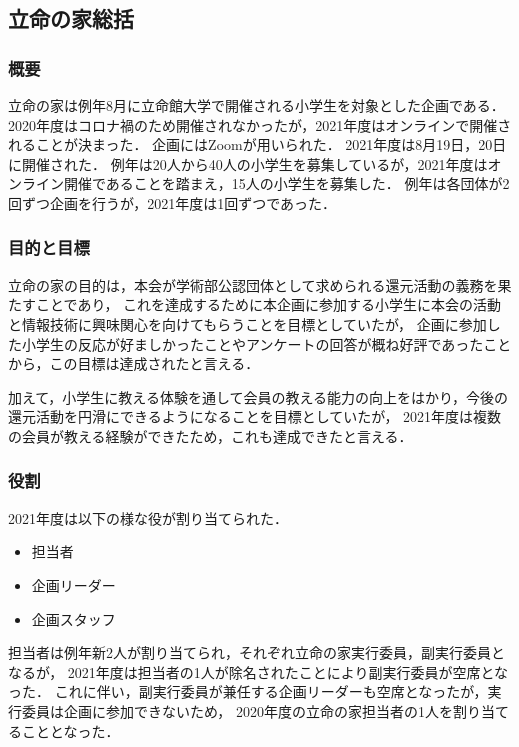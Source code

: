 \subsection*{立命の家総括}


\subsubsection*{概要}
立命の家は例年8月に立命館大学で開催される小学生を対象とした企画である．
2020年度はコロナ禍のため開催されなかったが，2021年度はオンラインで開催されることが決まった．
企画にはZoomが用いられた．
2021年度は8月19日，20日に開催された．
例年は20人から40人の小学生を募集しているが，2021年度はオンライン開催であることを踏まえ，15人の小学生を募集した．
例年は各団体が2回ずつ企画を行うが，2021年度は1回ずつであった．

\subsubsection*{目的と目標}
立命の家の目的は，本会が学術部公認団体として求められる還元活動の義務を果たすことであり，
これを達成するために本企画に参加する小学生に本会の活動と情報技術に興味関心を向けてもらうことを目標としていたが，
企画に参加した小学生の反応が好ましかったことやアンケートの回答が概ね好評であったことから，この目標は達成されたと言える．

加えて，小学生に教える体験を通して会員の教える能力の向上をはかり，今後の還元活動を円滑にできるようになることを目標としていたが，
2021年度は複数の会員が教える経験ができたため，これも達成できたと言える．

\subsubsection*{役割}
2021年度は以下の様な役が割り当てられた．
\begin{itemize}
  \item 担当者
  \item 企画リーダー
  \item 企画スタッフ
\end{itemize}
担当者は例年新\secondGrade{}2人が割り当てられ，それぞれ立命の家実行委員，副実行委員となるが，
2021年度は担当者の1人が除名されたことにより副実行委員が空席となった．
これに伴い，副実行委員が兼任する企画リーダーも空席となったが，実行委員は企画に参加できないため，
2020年度の立命の家担当者の1人を割り当てることとなった．

